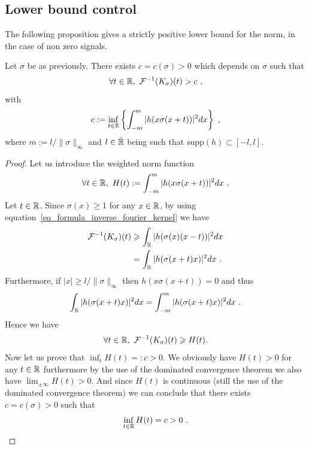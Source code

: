 \subsection{Lower bound control}

The following proposition gives a strictly positive lower bound for the norm, in the case of non zero signals.
\begin{prop}\label{prop_lower_bound_control_time_variance}
	Let $\sigma$ be as previously. There exists $c=c(\sigma)>0$ which depends on $\sigma$ such that
	\begin{equation}\label{eq_lower_bound_kernel}
		\forall t\in\mathbb{R}, \ \mathcal{F}^{-1}(K_\sigma)(t) > c\ ,
	\end{equation}
	with
	\begin{equation}
		c:= \inf_{t\in\mathbb{R}}\left\{ \int_{-m}^{m}|h(x\sigma(x+t))|^2 dx \right\}\ ,
	\end{equation}
	where $m:=l/\|\sigma\|_{\infty}$ and $l\in\bar{\mathbb{R}}$ being such that $\text{supp}(h)\subset [-l,l]$.
\end{prop}
\begin{proof}
    Let us introduce the weighted norm function
\begin{equation}
    \forall t\in\mathbb{R}, \ H(t) := \int_{-m}^{m} |h(x\sigma(x+t))|^2 dx\ .
\end{equation}
%
Let $t\in\mathbb{R}$. Since $\sigma(x)\geqslant1$ for any $x\in\mathbb{R}$, by using equation~\eqref{eq_formula_inverse_fourier_kernel} we have
\begin{align*}
    \mathcal{F}^{-1}(K_\sigma)(t) & \geqslant \int_{\mathbb{R}} |h(\sigma(x)(x-t))|^2 dx \\
    & = \int_{\mathbb{R}} |h(\sigma(x+t)x)|^2 dx\ .
\end{align*}
Furthermore, if $|x|\geqslant l/\|\sigma\|_\infty$ then $h(x\sigma(x+t))=0$ and thus
\begin{equation}
    \int_{\mathbb{R}} |h(\sigma(x+t)x)|^2 dx = \int_{-m}^m |h(\sigma(x+t)x)|^2 dx\ .
\end{equation}
%
Hence we have
\begin{equation}
    \forall t\in\R, \ \mathcal{F}^{-1}(K_\sigma)(t)\geqslant H(t).
\end{equation}
Now let us prove that $\inf_t H(t) =: c >0$. We obviously have $H(t)>0$ for any $t\in\mathbb{R}$ furthermore by the use of the dominated convergence theorem we also have $\lim_{\pm\infty}H(t)>0$. And since $H(t)$ is continuous (still the use of the dominated convergence theorem) we can conclude that there exists $c=c(\sigma)>0$ such that
\begin{equation}
    \inf_{t\in\R}H(t)=c>0\ .
\end{equation}
\end{proof}

